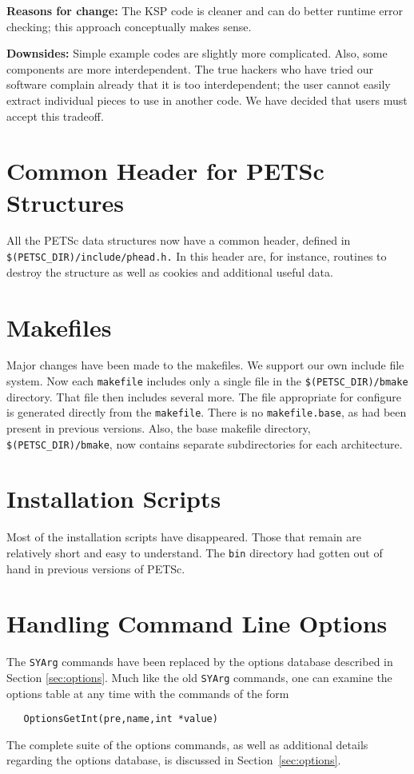 {\bf Reasons for change:}  The KSP code is cleaner and can do better
runtime error checking; this approach conceptually makes sense.

{\bf Downsides:}  Simple example codes are slightly more complicated.
Also, some components are more interdependent. The true hackers who have 
tried our software complain already that it is too interdependent; the 
user cannot easily extract individual pieces to use in another code. 
We have decided that users must accept this tradeoff. 

\section{Common Header for PETSc Structures}

All the PETSc data structures now have a common header, defined 
in {\tt \$(PETSC\_DIR)/include/phead.h.} In this header are, for 
instance, routines to destroy the structure as well as cookies and 
additional useful data. 

\section{Makefiles}

Major changes have been made to the makefiles.  We support our 
own include file system.  Now each {\tt makefile} 
includes only a single file in the {\tt \$(PETSC\_DIR)/bmake} directory. 
That file then includes several more. The file appropriate for configure 
is generated directly from the {\tt makefile}.  There is no 
{\tt makefile.base}, as had been present in previous versions.  
Also, the base makefile directory, {\tt \$(PETSC\_DIR)/bmake}, now 
contains separate subdirectories for each architecture.

\section{Installation Scripts} 

Most of the installation scripts have disappeared.  Those that remain 
are relatively short and easy to understand. The {\tt bin} directory 
had gotten out of hand in previous versions of PETSc. 

\section{Handling Command Line Options}

The {\tt SYArg} commands have been replaced by the options database
described in Section \ref{sec:options}.
Much like the old {\tt SYArg} commands, one can examine the options 
table at any time with the commands of the form
\begin{verbatim}
   OptionsGetInt(pre,name,int *value)
\end{verbatim}
The complete suite of the options commands, as well as additional details
regarding the options database, is discussed in Section~\ref{sec:options}.

